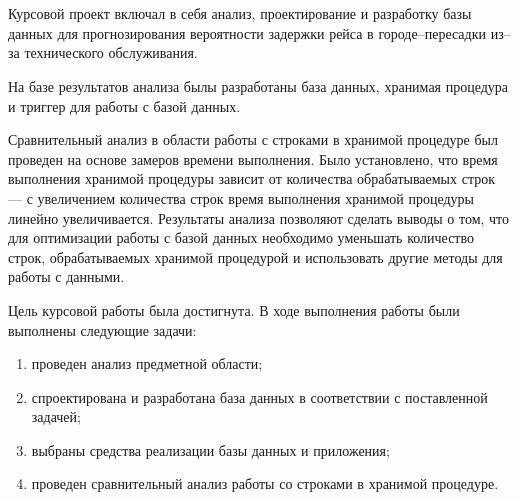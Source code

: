 \chapter*{}

Курсовой проект включал в себя анализ, проектирование и разработку
базы данных для прогнозирования вероятности задержки рейса в городе--пересадки из--за технического обслуживания.

На базе результатов анализа былы разработаны база данных, хранимая процедура и триггер для работы с базой данных.

Сравнительный анализ в области работы с строками в хранимой процедуре был проведен на основе замеров времени выполнения.
Было установлено, что время выполнения хранимой процедуры зависит от количества обрабатываемых строк --- с увеличением количества строк время выполнения хранимой процедуры линейно увеличивается.
Результаты анализа позволяют сделать выводы о том, что для оптимизации работы с базой данных необходимо уменьшать количество строк, обрабатываемых хранимой процедурой
и использовать другие методы для работы с данными.

Цель курсовой работы была достигнута.
В ходе выполнения работы были выполнены следующие задачи:
\begin{enumerate}[label=\arabic*)]
	\item проведен анализ предметной области;
	\item спроектирована и разработана база данных в соответствии с поставленной задачей;
	\item выбраны средства реализации базы данных и приложения;
	\item проведен сравнительный анализ работы со строками в хранимой процедуре.
\end{enumerate}
